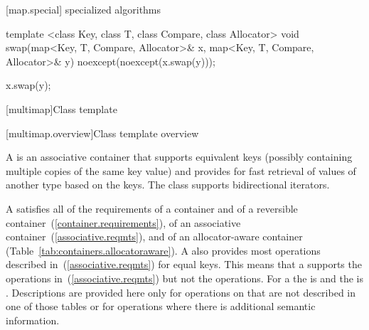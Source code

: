 [map.special]{ specialized algorithms}

%
%
\begin{itemdecl}
template <class Key, class T, class Compare, class Allocator>
  void swap(map<Key, T, Compare, Allocator>& x,
            map<Key, T, Compare, Allocator>& y)
    noexcept(noexcept(x.swap(y)));
\end{itemdecl}

\begin{itemdescr}
\pnum
\effects
\begin{codeblock}
x.swap(y);
\end{codeblock}
\end{itemdescr}

[multimap]{Class template }

[multimap.overview]{Class template  overview}

\pnum
{}%
A
is an associative container that supports equivalent keys (possibly containing multiple copies of
the same key value) and provides for fast retrieval of values of another type
based on the keys.
The
class
supports bidirectional iterators.

\pnum
A
 satisfies all of the requirements of a container and of a
reversible container~(\ref{container.requirements}), of an associative
container~(\ref{associative.reqmts}), and of an allocator-aware container
(Table~\ref{tab:containers.allocatoraware}).
A
also provides most operations described in~(\ref{associative.reqmts})
for equal keys.
This means that a
supports the
operations in~(\ref{associative.reqmts})
but not the
operations.
For a
the
is
and the
is
.
Descriptions are provided here only for operations on
that are not described in one of those tables
or for operations where there is additional semantic information.


